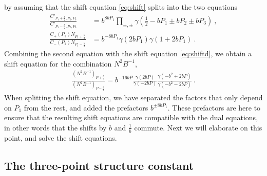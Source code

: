 \documentclass[12pt, a4paper, notitlepage, twoside]{report}
\numberwithin{equation}{section}
\theoremstyle{break}
\begin{document}
by assuming that the shift equation \eqref{eq:shift} splits into the two equations 
\begin{align}
\frac{C'_{P_1+\frac{b}{2},P_2,P_3}}{C'_{P_1-\frac{b}{2},P_2,P_3} } 
 &=b^{8bP_1}\prod_{\pm,\pm} \gamma(\tfrac12 -bP_1 \pm bP_2 \pm bP_3)\ ,
 \label{cps}
 \\
\frac{C_+(P_1) N_{P_1+\frac{b}{2}}}{C_-(P_1) N_{P_1-\frac{b}{2}} } 
 &=b^{-8bP_1}\gamma(2bP_1) \gamma(1+2bP_1) \ .
 \label{cns}
\end{align}
Combining the second equation with the shift equation \eqref{eq:shiftd}, we obtain a shift equation for the combination $N^2B^{-1}$,
\begin{align}
 \frac{\left(N^2B^{-1}\right)_{P+\frac{b}{2}}}{\left(N^2B^{-1}\right)_{P-\frac{b}{2}}} = b^{-16bP} \frac{\gamma(2bP)}{\gamma(-2bP)} \frac{\gamma(-b^2+2bP)}{\gamma(-b^2-2bP)}\ .
 \label{nbs}
\end{align}
When splitting the shift equation, we have separated the factors that only depend on $P_1$ from the rest, and added the prefactors $b^{\pm 8bP_1}$. These prefactors are here to ensure that the resulting shift equations are compatible with the dual equations, in other words that the shifts by $b$ and $\frac{1}{b}$ commute. Next we will elaborate on this point, and solve the shift equations.


\subsection{The three-point structure constant \label{sectpf}}
\end{document}
